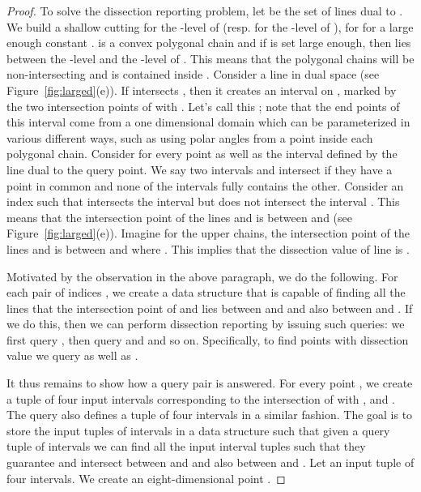 \begin{proof}
    To solve the dissection reporting problem, let  be the set of lines dual to . 
    We build a shallow cutting  for the -level of
     (resp.  for the -level of ), for  for a large enough constant .
     is a convex polygonal chain and  if
     is set large enough, then  lies between the -level and the -level of .
    This means that the polygonal chains  will be non-intersecting and  is contained
    inside .
    Consider a line  in dual space (see Figure~\ref{fig:larged}(e)).
    If  intersects , then it creates an interval on , marked by the two intersection
    points of  with . 
    Let's call this ; note that the end points of this interval come from a
    one dimensional domain which can be parameterized in various different ways, such as using
    polar angles from a point inside each polygonal chain.
    Consider  for every point  as well as the
    interval  defined by the
    line dual to the query point. 
    We say two intervals  and  intersect if they have a point in common and none of the intervals
    fully contains the other.
    Consider an index  such that  intersects the interval   
    but  does not intersect the interval .
    This means that the intersection point of the lines  and  is between
     and  (see Figure~\ref{fig:larged}(e)).
	Imagine for the upper chains, the intersection point of the lines  and  
	is between  and  where .
    This implies that the dissection value of line  is .

    Motivated by the observation in the above paragraph, we do the following.
    For each pair of indices , we create a data structure that is capable of finding all the
	lines  that the intersection point of  and 
	lies between  and  and also between  and .
	If we do this, then we can perform dissection reporting by issuing  such queries:
	we first query , then query  and  and so on.
	Specifically, to find points with dissection value  we query
	 as well as .

	It thus remains to show how a query pair  is answered.
    For every point , we create a tuple of four input intervals corresponding to the
	intersection of  with , and .
    The query also defines a tuple of four intervals in a similar fashion.
	The goal is to store the input tuples of intervals in a data structure
    such that given a query tuple of intervals
    we can find all the input interval tuples such that they
	guarantee  and  intersect between  and  and also between  and .
	Let  an input tuple of four intervals.
	We create an eight-dimensional  point .


\end{proof}
